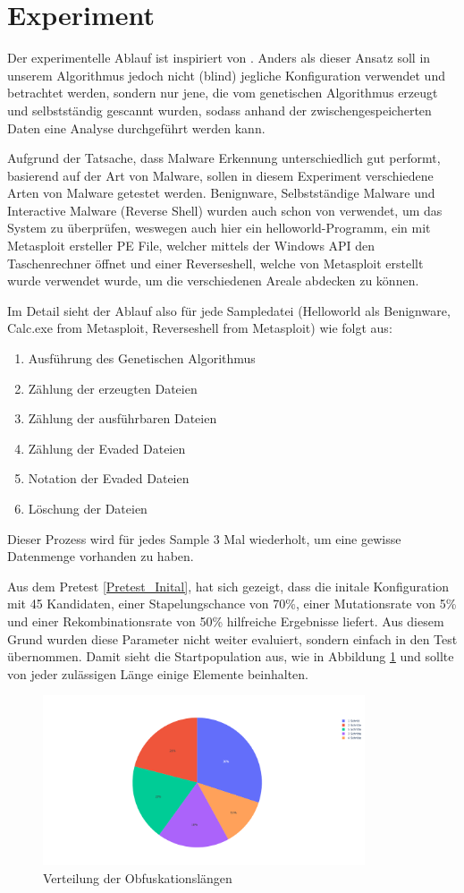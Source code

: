 \section{Experiment}
\label{Sec:Experiment}
Der experimentelle Ablauf ist inspiriert von \cite{holm_2023_hide}. 
Anders als dieser Ansatz soll in unserem Algorithmus jedoch nicht (blind) jegliche Konfiguration verwendet und betrachtet werden, sondern nur jene, die vom genetischen Algorithmus erzeugt und selbstständig gescannt wurden, sodass anhand der zwischengespeicherten Daten eine Analyse durchgeführt werden kann.

Aufgrund der Tatsache, dass Malware Erkennung unterschiedlich gut performt, basierend auf der Art von Malware, sollen in diesem Experiment verschiedene Arten von Malware getestet werden. Benignware, Selbstständige Malware und Interactive Malware (Reverse Shell) wurden auch schon von \cite{holm_2023_hide} verwendet, um das System zu überprüfen, weswegen auch hier ein helloworld-Programm, ein mit Metasploit ersteller PE File, welcher mittels der Windows API den Taschenrechner öffnet und einer Reverseshell, welche von Metasploit erstellt wurde verwendet wurde, um die verschiedenen Areale abdecken zu können.

Im Detail sieht der Ablauf also für jede Sampledatei (Helloworld als Benignware, Calc.exe from Metasploit, Reverseshell from Metasploit) wie folgt aus:
\begin{enumerate}
    \item Ausführung des Genetischen Algorithmus
    \item Zählung der erzeugten Dateien
    \item Zählung der ausführbaren Dateien
    \item Zählung der Evaded Dateien
    \item Notation der Evaded Dateien
    \item Löschung der Dateien
\end{enumerate}
Dieser Prozess wird für jedes Sample 3 Mal wiederholt, um eine gewisse Datenmenge vorhanden zu haben.

Aus dem Pretest \ref{Pretest_Inital}, hat sich gezeigt, dass die initale Konfiguration mit 45 Kandidaten, einer Stapelungschance von 70\%, einer Mutationsrate von 5\% und einer Rekombinationsrate von 50\% hilfreiche Ergebnisse liefert. Aus diesem Grund wurden diese Parameter nicht weiter evaluiert, sondern einfach in den Test übernommen. Damit sieht die Startpopulation aus, wie in Abbildung \ref{fig:startpopulation} und sollte von jeder zulässigen Länge einige Elemente beinhalten.


\begin{figure}[h]
    \centering
    \includegraphics[width=0.85\textwidth]{gfx/Abbildungen/Startpopulation.png}
    \caption{Verteilung der Obfuskationslängen}
    \label{fig:startpopulation}
\end{figure}